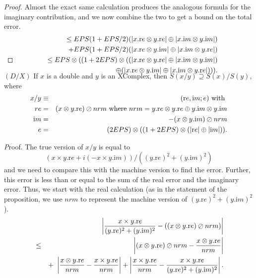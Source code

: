 \begin{proof}{}
Almost the exact same calculation produces the analogous formula for the imaginary contribution, and we now combine the
two to get a bound on the total error.  
\begin{eqnarray*}
&&\le EPS (1 + EPS/2) (|x.{\mathrm re} \otimes y.{\mathrm re}| \oplus |x.{\mathrm im} \otimes y.{\mathrm im}|) \\
&&\quad +
EPS (1 + EPS/2) (|x.{\mathrm re} \otimes y.{\mathrm im}| \oplus |x.{\mathrm im} \otimes y.{\mathrm re}| )\\
&&\le EPS \otimes ((1 +
2EPS)\otimes((|x.{\mathrm re} \otimes y.{\mathrm re}| \oplus |x.{\mathrm im} \otimes y.{\mathrm im}| ) \\
&&\quad \oplus
(|x.{\mathrm re} \otimes y.{\mathrm im}| \oplus |x.{\mathrm im} \otimes y.{\mathrm re}| ))).
\\
\noalign{\vskip-36pt}
\end{eqnarray*}
\end{proof}

\begin{proposition}\label{GMT 7.11}{$(D / X)$}
If $x$ is a double and $y$ is an {\textrm XComplex,} then
$S(x / y) \supseteq S(x) / S(y)${\textrm ,} where
\begin{eqnarray*}
x  / y & \equiv& ({\mathrm re},{\mathrm im};e)\hbox{ with }\\
re& =& (x  \otimes y.{\mathrm re})\oslash nrm \hbox{ where $nrm = y.{\mathrm re} \otimes y.{\mathrm re} \oplus y.{\mathrm im} \otimes
y.{\mathrm im}$}
\\
{\mathrm im} &=& -(x  \otimes y.{\mathrm im}) \oslash nrm\\
e& =& (2EPS) \otimes ((1 +  2EPS)\otimes(|{\mathrm re}| \oplus |{\mathrm im}|)).
\end{eqnarray*}
\end{proposition}

{\textit Proof}.
The true version of $x/y$ is equal to  
$$(x \times y.{\mathrm re} + i (-x \times y.{\mathrm im}))/ ((y.{\mathrm re})^2 + (y.{\mathrm im})^2)$$ and we need to compare this with the
machine version to find the error.  Further, this error is less than or equal to the sum of the real error and the imaginary
error. Thus, we start with the real calculation (as in the statement of the proposition, we use $nrm$ to represent the
machine version of $(y.{\mathrm re})^2 + (y.{\mathrm im})^2$).
\begin{eqnarray*}
&&\hskip-36pt \left|{x \times y.{\mathrm re}  \over (y.{\mathrm re})^2 + (y.{\mathrm im})^2} - ((x \otimes y.{\mathrm re})\oslash
nrm)\right|\\
&
\le &\left|(x
\otimes y.{\mathrm re}) \oslash nrm - {x \otimes y.{\mathrm re} \over nrm}\right|\\
&& +\ \left|{x \otimes y.{\mathrm re} \over nrm} - {x
\times y.{\mathrm re}
\over nrm}\right| + \left|{x \times y.{\mathrm re} \over nrm} - 
{x \times y.{\mathrm re}  \over (y.{\mathrm re})^2 + (y.{\mathrm im})^2}\right|.
\end{eqnarray*}
 
